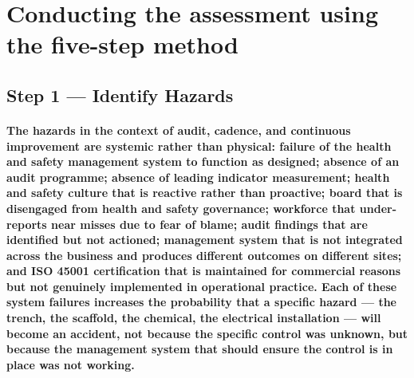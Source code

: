 \begin{itemize}
\end{itemize}

\section{Conducting the assessment using the five-step method}

\subsection{Step 1 --- Identify Hazards}
\paragraph{The hazards in the context of audit, cadence, and continuous improvement are systemic rather than physical: failure of the health and safety management system to function as designed; absence of an audit programme; absence of leading indicator measurement; health and safety culture that is reactive rather than proactive; board that is disengaged from health and safety governance; workforce that under-reports near misses due to fear of blame; audit findings that are identified but not actioned; management system that is not integrated across the business and produces different outcomes on different sites; and ISO 45001 certification that is maintained for commercial reasons but not genuinely implemented in operational practice. Each of these system failures increases the probability that a specific hazard --- the trench, the scaffold, the chemical, the electrical installation --- will become an accident, not because the specific control was unknown, but because the management system that should ensure the control is in place was not working.}

